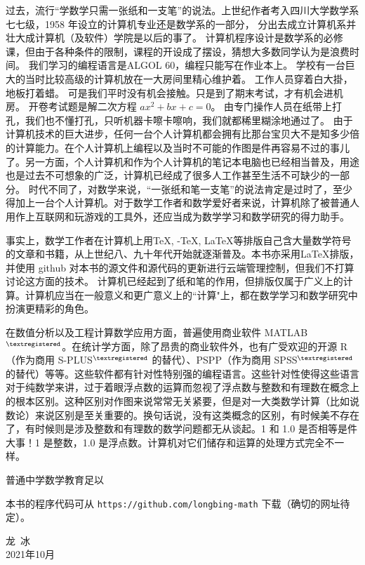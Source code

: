 \documentclass[main.tex]{subfiles}
\begin{document}
过去，流行“学数学只需一张纸和一支笔”的说法。上世纪作者考入四川大学数学系七七级，1958 年设立的计算机专业还是数学系的一部分，
分出去成立计算机系并壮大成计算机（及软件）学院是以后的事了。
计算机程序设计是数学系的必修课，但由于各种条件的限制，课程的开设成了摆设，猜想大多数同学认为是浪费时间。
我们学习的编程语言是ALGOL 60，编程只能写在作业本上。
学校有一台巨大的当时比较高级的计算机放在一大房间里精心维护着。
工作人员穿着白大掛，地板打着蜡。
可是我们平时没有机会接触。只是到了期末考试，才有机会进机房。
开卷考试题是解二次方程 $ax^2+bx+c = 0$。
由专门操作人员在纸带上打孔，我们也不懂打孔，只听机器卡嚓卡嚓响，我们就都稀里糊涂地通过了。
由于计算机技术的巨大进步，任何一台个人计算机都会拥有比那台宝贝大不是知多少倍的计算能力。在个人计算机上编程以及当时不可能的作图是件再容易不过的事儿了。另一方面，个人计算机和作为个人计算机的笔记本电脑也已经相当普及，用途也是过去不可想象的广泛，计算机已经成了很多人工作甚至生活不可缺少的一部分。
时代不同了，对数学来说，“一张纸和笔一支笔”的说法肯定是过时了，至少得加上一台个人计算机。对于数学工作者和数学爱好者来说，计算机除了被普通人用作上互联网和玩游戏的工具外，还应当成为数学学习和数学研究的得力助手。

事实上，数学工作者在计算机上用\TeX, \AmS-\TeX, \LaTeX 等排版自己含大量数学符号的文章和书籍，从上世纪八、九十年代开始就逐渐普及。本书亦采用\LaTeX 排版， 并使用 github 对本书的源文件和源代码的更新进行云端管理控制，但我们不打算讨论这方面的技术。
计算机已经起到了纸和笔的作用，但排版仅属于广义上的计算。计算机应当在一般意义和更广意义上的“计算"上，都在数学学习和数学研究中扮演更精彩的角色。

在数值分析以及工程计算数学应用方面，普遍使用商业软件 MATLAB${}^{\textregistered}$。在统计学方面，除了昂贵的商业软件外，也有广受欢迎的开源 R（作为商用 S-PLUS${}^{\textregistered}$ 的替代）、PSPP（作为商用 SPSS${}^{\textregistered}$ 的替代）等等。这些软件都有针对性特别强的编程语言。这些针对性使得这些语言对于纯数学来讲，过于着眼浮点数的运算而忽视了浮点数与整数和有理数在概念上的根本区别。这种区别对作图来说常常无关紧要，但是对一大类数学计算（比如说数论）来说区别是至关重要的。换句话说，没有这类概念的区别，有时候美不存在了，有时候则是涉及整数和有理数的数学问题都无从谈起。1 和 1.0 是否相等是件大事！1 是整数，1.0 是浮点数。计算机对它们储存和运算的处理方式完全不一样。

普通中学数学教育足以


本书的程序代码可从 \verb|https://github.com/longbing-math| 下载（确切的网址待定）。


\begin{flushright}
	\centering
{\kaishu 龙\,  冰}\\
2021年10月
\end{flushright}
\end{document}
